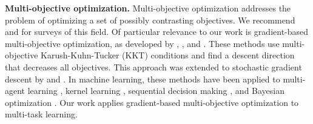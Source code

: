 \noindent \textbf{Multi-objective optimization.}
Multi-objective optimization addresses the problem of optimizing a set of possibly contrasting objectives. We recommend \citet{Miettinen1999} and \citet{Ehrgott2005} for surveys of this field. Of particular relevance to our work is gradient-based multi-objective optimization, as developed by \citet{Fliege2000}, \citet{Schaffler2002}, and \citet{Desideri2012}. These methods use multi-objective Karush-Kuhn-Tucker (KKT) conditions \citep{Kuhn1951} and find a descent direction that decreases all objectives. This approach was extended to stochastic gradient descent by \citet{Peitz2017} and \citet{Poirion2017}. In machine learning, these methods have been applied to multi-agent learning \citep{Ghish2013, Pirotta2016, Parisi2014}, kernel learning \citep{Cong2014}, sequential decision making \citep{Whiteson2018}, and Bayesian optimization \citep{Shah2016, Lobato2016}. Our work applies gradient-based multi-objective optimization to multi-task learning.
